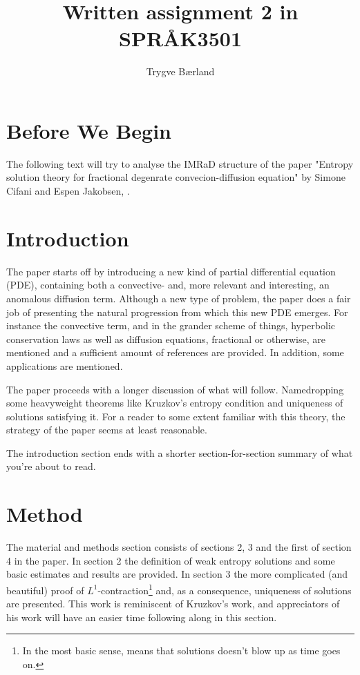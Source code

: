 \documentclass[11pt, a4paper]{article}
\begin{document}
\onehalfspacing

\title{Written assignment 2 in SPRÅK3501}
\author{Trygve Bærland}
\maketitle


\section*{Before We Begin}
The following text will try to analyse the IMRaD structure of the paper "Entropy solution theory for fractional degenrate convecion-diffusion equation" by Simone Cifani and Espen Jakobsen, \citep{Cifani}. 

\section*{Introduction}
The paper starts off by introducing a new kind of partial differential equation (PDE), containing both a convective- and, more relevant and interesting, an anomalous diffusion term. Although a new type of problem, the paper does a fair job of presenting the natural progression from which this new PDE emerges. For instance the convective term, and in the grander scheme of things, hyperbolic conservation laws as well as diffusion equations, fractional or otherwise, are mentioned and a sufficient amount of references are provided. In addition, some applications are mentioned.

The paper proceeds with a longer discussion of what will follow. Namedropping some heavyweight theorems like Kruzkov's entropy condition and uniqueness of solutions satisfying it. For a reader to some extent familiar with this theory, the strategy of the paper seems at least reasonable.

The introduction section ends with a shorter section-for-section summary of what you're about to read.

\section*{Method}
The material and methods section consists of sections 2, 3 and the first of section 4 in the paper. In section 2 the  definition of weak entropy solutions and some basic estimates and results are provided. In section 3 the more complicated (and beautiful) proof of $L^1$-contraction\footnote{In the most basic sense, means that solutions doesn't blow up as time goes on.} and, as a consequence, uniqueness of solutions are presented. This work is reminiscent of Kruzkov's work, and appreciators of his work will have an easier time following along in this section.
\end{document}
